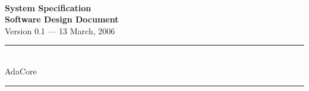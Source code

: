 \begin{titlepage}

\begin{center}
\textbf{\huge \ssat\\[\baselineskip]}
\textbf{\Huge System Specification}\\[\baselineskip]
\textbf{\huge Software Design Document}\\[\baselineskip]
{\large Version 0.1 --- 13 March, 2006}\\[\baselineskip]
\end{center}

\vfill

\begin{center}\sc
\rule{\textwidth}{1pt}\\
AdaCore\\

\rule{\textwidth}{1pt}\\
\end{center}

\end{titlepage}
